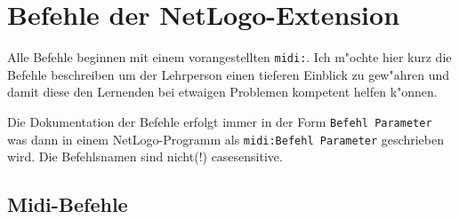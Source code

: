 \section{Befehle der NetLogo-Extension}
Alle Befehle beginnen mit einem vorangestellten \lstinline|midi:|. 
Ich m"ochte hier kurz die Befehle beschreiben um der Lehrperson einen tieferen 
Einblick zu gew"ahren und damit diese den Lernenden bei etwaigen Problemen kompetent
helfen k"onnen. 

Die Dokumentation der Befehle erfolgt immer in der Form \lstinline|Befehl Parameter|
was dann in einem NetLogo-Programm als \lstinline|midi:Befehl Parameter| geschrieben
wird. Die Befehlsnamen sind nicht(!) casesensitive. 
\subsection{Midi-Befehle}
